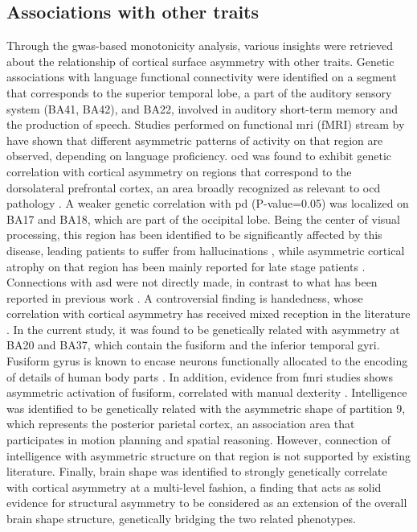 \subsection{Associations with other traits}
Through the \ac{gwas}-based monotonicity analysis, various insights were retrieved about the relationship of cortical surface asymmetry with other traits. Genetic associations with language functional connectivity  were identified on a segment that corresponds to the superior temporal lobe, a part of the auditory sensory system (BA41, BA42), and BA22, involved in auditory short-term memory and the production of speech. Studies performed on functional \ac{mri} (fMRI) stream by \citet{Hesling2012} have shown that different asymmetric patterns of activity on that region are observed, depending on language proficiency.  \Ac{ocd} was found to exhibit genetic correlation with cortical asymmetry on regions  that correspond to the dorsolateral prefrontal cortex, an area broadly recognized as relevant to \ac{ocd} pathology \cite{Li2020,Han2016}. A weaker genetic correlation with \ac{pd} (P-value=0.05) was localized on BA17 and BA18, which are part of the occipital lobe. Being the center of visual processing, this region has been identified to be significantly affected by this disease, leading patients to suffer from hallucinations \cite{Weil2016}, while asymmetric cortical atrophy on that region has been mainly reported for late stage patients \cite{Claassen2016}. Connections with \ac{asd} were not directly made, in contrast to what has been reported in previous work \cite{Kong2021}. A controversial finding is handedness, whose correlation with cortical asymmetry has received mixed reception in the literature \cite{Sun2006, Kong2021}. In the current study, it was found to be genetically related with asymmetry at BA20 and BA37, which contain the fusiform and the inferior temporal gyri. Fusiform gyrus is known to encase neurons functionally allocated to the encoding of details of human body parts \cite{Peelen2005}. In addition, evidence from f\ac{mri} studies shows asymmetric activation of fusiform, correlated with manual dexterity \cite{Bracci2010}. Intelligence was identified to be genetically related with the asymmetric shape of partition 9, which represents the posterior parietal cortex, an association area that participates in motion planning and spatial reasoning. However, connection of intelligence with asymmetric structure on that region is not supported by existing literature. Finally, brain shape \cite{Naqvi2021} was identified to strongly genetically correlate with cortical asymmetry at a multi-level fashion, a finding that acts as solid evidence  for structural asymmetry to be considered as an extension of the overall brain shape structure, genetically bridging the two related phenotypes.

